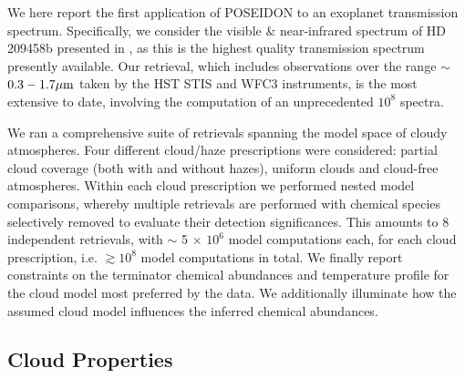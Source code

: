 \documentclass[fleqn,usenatbib]{mnras}
\begin{document}
We here report the first application of POSEIDON to an exoplanet transmission spectrum. Specifically, we consider the visible \& near-infrared spectrum of HD 209458b presented in \citet{Sing2016}, as this is the highest quality transmission spectrum presently available. Our retrieval, which includes observations over the range $\sim$ $0.3-1.7 \hbox{$\mu$m}$ taken by the HST STIS and WFC3 instruments, is the most extensive to date, involving the computation of an unprecedented $10^{8}$ spectra. 

We ran a comprehensive suite of retrievals spanning the model space of cloudy atmospheres. Four different cloud/haze prescriptions were considered: partial cloud coverage (both with and without hazes), uniform clouds and cloud-free atmospheres. Within each cloud prescription we performed nested model comparisons, whereby multiple retrievals are performed with chemical species selectively removed to evaluate their detection significances. This amounts to 8 independent retrievals, with $\sim$ 5 $\times$ $10^6$ model computations each, for each cloud prescription, i.e. $\gtrsim$$10^8$ model computations in total. We finally report constraints on the terminator chemical abundances and temperature profile for the cloud model most preferred by the data. We additionally illuminate how the assumed cloud model influences the inferred chemical abundances.

\subsection{Cloud Properties}\label{subsection:results_cloud_properties}
\end{document}
